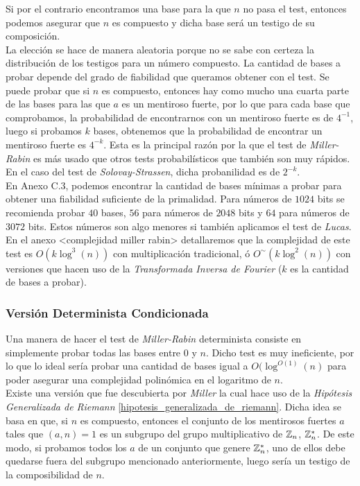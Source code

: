 Si por el contrario encontramos una base para la que $n$ no pasa el test, entonces podemos asegurar que $n$ es compuesto y dicha base será un testigo de su composición.\\

La elección se hace de manera aleatoria porque no se sabe con certeza la distribución de los testigos para un número compuesto. La cantidad de bases a probar depende del grado de fiabilidad que queramos obtener con el test. Se puede probar que si $n$ es compuesto, entonces hay como mucho una cuarta parte de las bases para las que $a$ es un mentiroso fuerte, por lo que para cada base que comprobamos, la probabilidad de encontrarnos con un mentiroso fuerte es de $4^{-1}$, luego si probamos $k$ bases, obtenemos que la probabilidad de encontrar un mentiroso fuerte es $4^{-k}$. Esta es la principal razón por la que el test de \textit{Miller-Rabin} es más usado que otros tests probabilísticos que también son muy rápidos. En el caso del test de \textit{Solovay-Strassen}, dicha probanilidad es de $2^{-k}$.\\

En \cite{digital_signature_standard} Anexo C.3, podemos encontrar la cantidad de bases mínimas a probar para obtener una fiabilidad suficiente de la primalidad. Para números de $1024$ bits se recomienda probar $40$ bases, $56$ para números de $2048$ bits y $64$ para números de $3072$ bits. Estos números son algo menores si también aplicamos el test de \textit{Lucas}.\\

En el anexo <complejidad miller rabin> detallaremos que la complejidad de este test es $O(k\log^3(n))$ con multiplicación tradicional, ó $O^\sim(k\log^2(n))$ con versiones que hacen uso de la \textit{Transformada Inversa de Fourier} ($k$ es la cantidad de bases a probar).

\subsubsection{Versión Determinista Condicionada}

Una manera de hacer el test de \textit{Miller-Rabin} determinista consiste en simplemente probar todas las bases entre $0$ y $n$. Dicho test es muy ineficiente, por lo que lo ideal sería probar una cantidad de bases igual a $O(\log^{O(1)}(n)$ para poder asegurar una complejidad polinómica en el logaritmo de $n$.\\

Existe una versión que fue descubierta por \textit{Miller} la cual hace uso de la \textit{Hipótesis Generalizada de Riemann} \ref{hipotesis_generalizada_de_riemann}. Dicha idea se basa en que, si $n$ es compuesto, entonces el conjunto de los mentirosos fuertes $a$ tales que $(a, n) = 1$ es un subgrupo del grupo multiplicativo de $\mathbb{Z}_n$, $\mathbb{Z}_n^*$. De este modo, si probamos todos los $a$ de un conjunto que genere $\mathbb{Z}_n^*$, uno de ellos debe quedarse fuera del subgrupo mencionado anteriormente, luego sería un testigo de la composibilidad de $n$.\\

